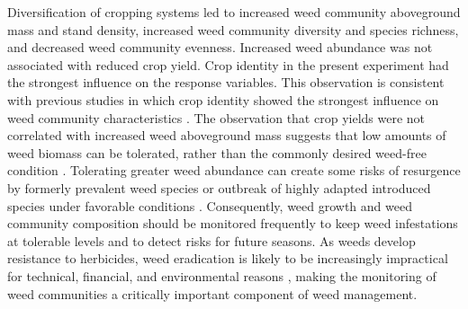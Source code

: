 \documentclass[
]{article}
\begin{document}
Diversification of cropping systems led to increased weed community aboveground mass and stand density, increased weed community diversity and species richness, and decreased weed community evenness. Increased weed abundance was not associated with reduced crop yield. Crop identity in the present experiment had the strongest influence on the response variables. This observation is consistent with previous studies in which crop identity showed the strongest influence on weed community characteristics \citep{legereDiversityAssemblyWeed2005, smithAssemblyWeedCommunities2007}. The observation that crop yields were not correlated with increased weed aboveground mass suggests that low amounts of weed biomass can be tolerated, rather than the commonly desired weed-free condition \citep{zimdahlNeedHistoricalPerspective2012}. Tolerating greater weed abundance can create some risks of resurgence by formerly prevalent weed species or outbreak of highly adapted introduced species under favorable conditions \citep{mohlerWeedEvolutionCommunity2001}. Consequently, weed growth and weed community composition should be monitored frequently to keep weed infestations at tolerable levels and to detect risks for future seasons. As weeds develop resistance to herbicides, weed eradication is likely to be increasingly impractical for technical, financial, and environmental reasons \citep{brookesKeyEnvironmentalImpacts2013, stewartWeedControlEnvironmental2011}, making the monitoring of weed communities a critically important component of weed management.
\end{document}
